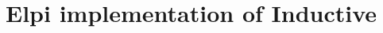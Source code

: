 \documentclass[thesis.tex]{subfiles}
\begin{document}
\chapter{Elpi implementation of Inductive}



\end{document}
